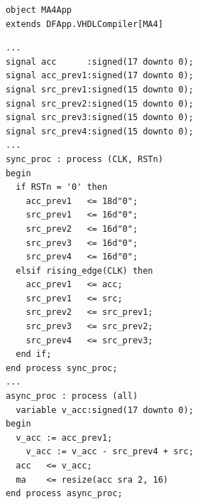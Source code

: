 \begin{figure}[t!]
\begin{minipage}[b][10cm][t]{0.32\linewidth}
\begin{verbatim}
			object MA4App 
			extends DFApp.VHDLCompiler[MA4]
    \end{verbatim}
    \label{fig:MADFiant}
  \end{minipage}%
  \hfill
  \begin{minipage}[b][10cm][t]{0.325\linewidth}
    \centering
    \captionsetup{justification=centering}
		\begin{verbatim}
			...
			signal acc      :signed(17 downto 0);
			signal acc_prev1:signed(17 downto 0);
			signal src_prev1:signed(15 downto 0);
			signal src_prev2:signed(15 downto 0);
			signal src_prev3:signed(15 downto 0);
			signal src_prev4:signed(15 downto 0);
			...
			sync_proc : process (CLK, RSTn)
			begin
			  if RSTn = '0' then
			    acc_prev1   <= 18d"0";
			    src_prev1   <= 16d"0";
			    src_prev2   <= 16d"0";
			    src_prev3   <= 16d"0";
			    src_prev4   <= 16d"0";
			  elsif rising_edge(CLK) then
			    acc_prev1   <= acc;
			    src_prev1   <= src;
			    src_prev2   <= src_prev1;
			    src_prev3   <= src_prev2;
			    src_prev4   <= src_prev3;
			  end if;
			end process sync_proc;
			...
			async_proc : process (all)
			  variable v_acc:signed(17 downto 0);
			begin
			  v_acc := acc_prev1;
				v_acc := v_acc - src_prev4 + src;
			  acc   <= v_acc;
			  ma    <= resize(acc sra 2, 16)
			end process async_proc;
    \end{verbatim}
    \label{fig:MAVHDL}
  \end{minipage}%
	\hfill
  \begin{minipage}[b][10cm][t]{0.34\linewidth}
		\centering


\end{minipage}
\end{figure}
